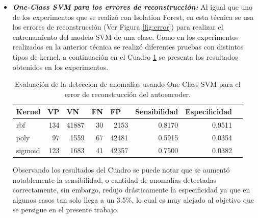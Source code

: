 \begin{itemize}
\item \textbf{\textit{One-Class SVM para los errores de reconstrucci\'{o}n: }}Al igual que uno de los experimentos que se realiz\'{o} con Isolation Forest, en esta t\'{e}cnica se usa los errores de reconstrucci\'{o}n (Ver Figura \ref{fig:error}) para realizar el entrenamiento del modelo SVM de una clase. Como en los experimentos realizados en la anterior t\'{e}cnica se realiz\'{o} diferentes pruebas con distintos tipos de kernel, a continuaci\'{o}n en el Cuadro \ref{table:evaluacion_SVM_error} se presenta los resultados obtenidos en los experimentos.

\begin{table}[H]
\centering
\begin{center}
\begin{tabular}{|l|r|r|r|r|r|r|r|}
\hline
\textbf{Kernel} & \multicolumn{1}{l|}{\textbf{VP}} & \multicolumn{1}{l|}{\textbf{VN}}& \multicolumn{1}{l|}{\textbf{FN}}& \multicolumn{1}{l|}{\textbf{FP}} & \multicolumn{1}{l|}{\textbf{Sensibilidad}} & \multicolumn{1}{l|}{\textbf{Especificidad}} \\ \hline
rbf & \cellcolor[HTML]{AADD99} 134 & \cellcolor[HTML]{AADD99} 41887 & \cellcolor[HTML]{FFCE93} 30 & \cellcolor[HTML]{FFCE93} 2153 & 0.8170 & 0.9511 \\ \hline
poly & \cellcolor[HTML]{AADD99} 97 & \cellcolor[HTML]{AADD99} 1559 & \cellcolor[HTML]{FFCE93} 67 & \cellcolor[HTML]{FFCE93} 42481 & 0.5915 & 0.0354 \\ \hline
sigmoid & \cellcolor[HTML]{AADD99} 123 & \cellcolor[HTML]{AADD99} 1683 & \cellcolor[HTML]{FFCE93} 41 & \cellcolor[HTML]{FFCE93} 42357 & 0.7500 & 0.0382 \\ \hline
\end{tabular}
\end{center}
\caption{Evaluaci\'{o}n de la detecci\'{o}n de anomal\'{i}as usando One-Class SVM para el error de reconstrucci\'{o}n del autoencoder.}

\label{table:evaluacion_SVM_error}
\end{table}


Observando los resultados del Cuadro se puede notar que se aument\'{o} notablemente la sensibilidad, o cantidad de anomal\'{i}as detectadas correctamente, sin embargo, redujo dr\'{a}sticamente la especificidad ya que en algunos casos tan solo llega a un 3.5\%, lo cual es muy alejado al objetivo que se persigue en el presente trabajo.

\end{itemize}

